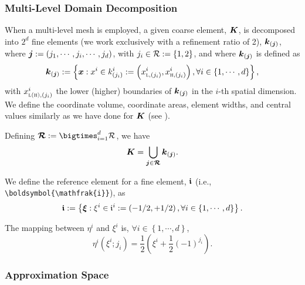 \subsubsection{Multi-Level Domain Decomposition}

When a multi-level mesh is employed, a given coarse element, $\boldsymbol{K}$,
is decomposed into $2^{d}$ fine elements
(we work exclusively with a refinement ratio of 2),
$\boldsymbol{k}_{\left(\boldsymbol{j}\right)}$,
where $\boldsymbol{j}:=\left(j_{1},\cdots,j_{i},\cdots,j_{d}\right)$,
with $j_{i}\in\mathcal{R}:=\left\{1,2\right\}$,
and where $\boldsymbol{k}_{\left(\boldsymbol{j}\right)}$ is defined as
\begin{equation}
  \boldsymbol{k}_{\left(\boldsymbol{j}\right)}
  :=\left\{\boldsymbol{x}:x^{i}\in k^{i}_{\left(j_{i}\right)}
  :=\left(x^{i}_{\textsc{l},\left(j_{i}\right)},
          x^{i}_{\textsc{h},\left(j_{i}\right)}\right),
          \forall i\in\left\{1,\cdots,d\right\}\right\},
\end{equation}
with $x^{i}_{\textsc{l(h)},\left(j_{i}\right)}$ the lower (higher) boundaries
of $\boldsymbol{k}_{\left(\boldsymbol{j}\right)}$ in the $i$-th spatial dimension.
We define the coordinate volume, coordinate areas, element widths, and
central values similarly as we have done for $\boldsymbol{K}$ (see ).

Defining $\bc{R}:=\bigtimes_{i=1}^{d}\mc{R}$,
we have
\begin{equation}
  \boldsymbol{K}=\bigcup\limits_{\boldsymbol{j}\in\boldsymbol{\mathcal{R}}}
  \boldsymbol{k}_{\left(\boldsymbol{j}\right)}.
\end{equation}

We define the reference element for a fine element,
$\boldsymbol{\mathfrak{i}}$ (i.e., \verb"\boldsymbol{\mathfrak{i}}"), as
\begin{equation}
  \boldsymbol{\mathfrak{i}}
  :=\left\{\boldsymbol{\xi}:\xi^{i}\in\mathfrak{i}^{i}
  :=\left(-1/2,+1/2\right),\forall i\in\left\{1,\cdots,d\right\}\right\}.
\end{equation}

The mapping between $\eta^{i}$ and $\xi^{i}$ is,
$\forall i\in\left\{1,\cdots,d\right\}$,
\begin{equation}
  \eta^{i}\left(\xi^{i};j_{i}\right)
  =\frac{1}{2}\left(\xi^{i}+\frac{1}{2}\left(-1\right)^{j_{i}}\right).
\end{equation}

\subsubsection{Approximation Space}

